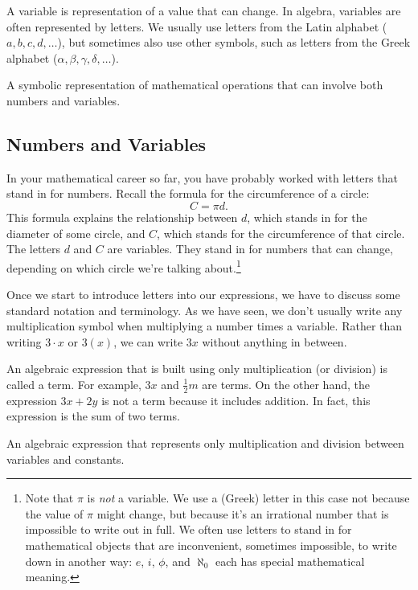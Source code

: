 \begin{boxeddef}[Variable]
A \gls{variable} is representation of a value that can change. In algebra, variables are often represented by letters. We usually use letters from the Latin alphabet ($a, b, c, d,\dotsc$), but sometimes also use other symbols, such as letters from the Greek alphabet ($\alpha, \beta, \gamma, \delta, \dotsc$).
\end{boxeddef}

\begin{boxeddef}
A symbolic representation of mathematical operations that can involve both numbers and variables.
\end{boxeddef}

\subsection{Numbers and Variables}

In your mathematical career so far, you have probably worked with letters that stand in for numbers. Recall the formula for the circumference of a circle: \[C = \pi d.\]
This formula explains the relationship between $d$, which stands in for the diameter of some circle, and $C$, which stands for the circumference of that circle. The letters $d$ and $C$ are variables. They stand in for numbers that can change, depending on which circle we're talking about.\footnote{Note that $\pi$ is \textit{not} a variable. We use a (Greek) letter in this case not because the value of $\pi$ might change, but because it's an irrational number that is impossible to write out in full. We often use letters to stand in for mathematical objects that are inconvenient, sometimes impossible, to write down in another way: $e$, $i$, $\phi$, and $\aleph_0$ each has special mathematical meaning.}

Once we start to introduce letters into our expressions, we have to discuss some standard notation and terminology. As we have seen, we don't usually write any multiplication symbol when multiplying a number times a variable. Rather than writing $3\cdot x$ or $3(x)$, we can write $3x$ without anything in between.

An algebraic expression that is built using only multiplication (or division) is called a \gls{term}. For example, $3x$ and $\frac{1}{2}m$ are terms. On the other hand, the expression $3x+2y$ is not a term because it includes addition. In fact, this expression is the sum of two terms.

\begin{boxeddef}[Term]
An algebraic expression that represents only multiplication and division between variables and constants.
\end{boxeddef}

